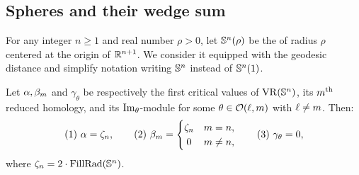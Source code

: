 
\subsection{Spheres and their wedge sum }\label{ss:Sn}\label{subsub:critical values of Sn}

For any integer $n \geq 1$ and real number $\rho > 0$, let $\mathbb{S}^n(\rho)$ be the  of radius $\rho$ centered at the origin of $\mathbb{R}^{n+1}$.
We consider it equipped with the geodesic distance and simplify notation writing \(\mathbb{S}^n\) instead of \(\mathbb{S}^n(1)\).


\medskip\proposition {}
Let $\alpha, \beta_m$ and $\gamma_\theta$ be respectively the first critical values of $\operatorname{VR}(\mathbb{S}^n)$, its $m^{\mathrm{th}}$ reduced homology, and its $\operatorname{Im}_\theta$-module for some \(\theta \in \mathcal{O}(\ell,m)\) with \(\ell \neq m\).
Then:
\[
\mathrm{(1)}\ \alpha = \zeta_n,
\qquad
\mathrm{(2)}\ \beta_m =
\begin{cases}
	\zeta_n & m = n, \\
	\hfil 0 & m \neq n,
\end{cases}
\qquad
\mathrm{(3)}\ \gamma_\theta = 0,
\]
where \(\zeta_n = 2 \cdot \operatorname{FillRad}(\mathbb{S}^n)\).

